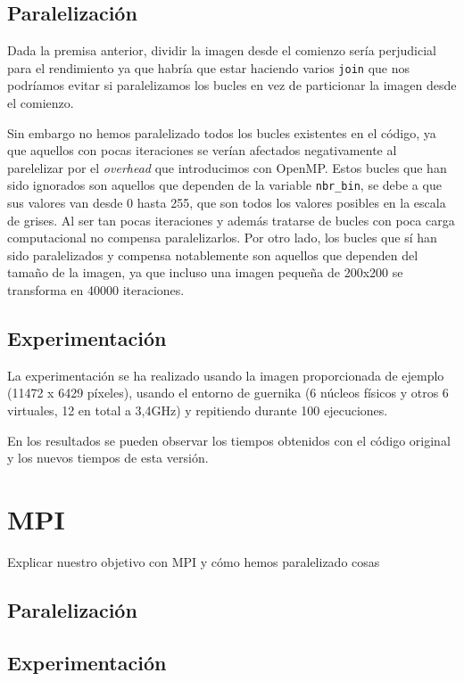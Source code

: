 \documentclass[12pt]{report} %
\begin{document}
\section{Paralelización}

Dada la premisa anterior, dividir la imagen desde el comienzo sería perjudicial para el rendimiento ya que habría que estar haciendo varios \texttt{join} que nos podríamos evitar si paralelizamos los bucles en vez de particionar la imagen desde el comienzo.

Sin embargo no hemos paralelizado todos los bucles existentes en el código, ya que aquellos con pocas iteraciones se verían afectados negativamente al parelelizar por el \textit{overhead} que introducimos con OpenMP. Estos bucles que han sido ignorados son aquellos que dependen de la variable \texttt{nbr\_bin}, se debe a que sus valores van desde 0 hasta 255, que son todos los valores posibles en la escala de grises. Al ser tan pocas iteraciones y además tratarse de bucles con poca carga computacional no compensa paralelizarlos. Por otro lado, los bucles que sí han sido paralelizados y compensa notablemente son aquellos que dependen del tamaño de la imagen, ya que incluso una imagen pequeña de 200x200 se transforma en 40000 iteraciones.


\section{Experimentación}

La experimentación se ha realizado usando la imagen proporcionada de ejemplo (11472 x 6429 píxeles), usando el entorno de guernika (6 núcleos físicos y otros 6 virtuales, 12 en total a 3,4GHz) y repitiendo durante 100 ejecuciones.

En los resultados se pueden observar los tiempos obtenidos con el código original y los nuevos tiempos de esta versión.

\chapter{MPI}
\label{chap:MPI}

Explicar nuestro objetivo con MPI y cómo hemos paralelizado cosas

\section{Paralelización}

\section{Experimentación}
\end{document}
